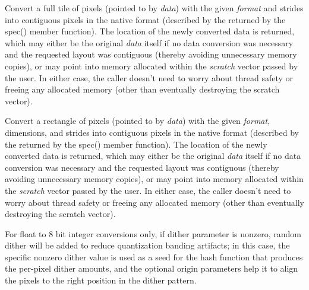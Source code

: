 Convert a full tile of pixels (pointed to by \emph{data}) with the given
\emph{format} and strides into contiguous pixels in the native format
(described by the \ImageSpec returned by the {\cf spec()} member
function).  The location of the newly converted data is returned, which
may either be the original \emph{data} itself if no data conversion was
necessary and the requested layout was contiguous (thereby avoiding
unnecessary memory copies), or may point into memory allocated within
the \emph{scratch} vector passed by the user.  In either case, the
caller doesn't need to worry about thread safety or freeing any
allocated memory (other than eventually destroying the scratch vector).

\apiend


Convert a rectangle of pixels (pointed to by \emph{data}) with the given
\emph{format}, dimensions, and strides into contiguous pixels in the
native format (described by the \ImageSpec returned by the {\cf spec()}
member function).  The location of the newly converted data is returned,
which may either be the original \emph{data} itself if no data
conversion was necessary and the requested layout was contiguous
(thereby avoiding unnecessary memory copies), or may point into memory
allocated within the \emph{scratch} vector passed by the user.  In
either case, the caller doesn't need to worry about thread safety or
freeing any allocated memory (other than eventually destroying the
scratch vector).

\apiend

For {\cf float} to 8 bit integer conversions only, if {\cf dither} parameter
is nonzero, random dither will be added to reduce quantization banding
artifacts; in this case, the specific nonzero {\cf dither} value is used as
a seed for the hash function that produces the per-pixel dither amounts, and
the optional {\cf origin} parameters help it to align the pixels to the
right position in the dither pattern.


